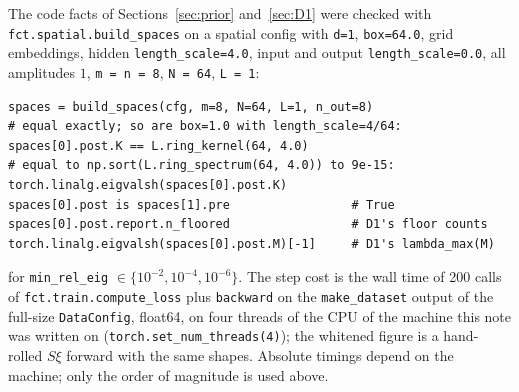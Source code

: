 \documentclass[11pt,a4paper]{article}
\newcommand{\code}[1]{\texttt{#1}}
\begin{document}
The code facts of Sections~\ref{sec:prior} and~\ref{sec:D1} were checked with \code{fct.spatial.build\_spaces} on a spatial config with \code{d=1}, \code{box=64.0}, grid embeddings, hidden \code{length\_scale=4.0}, input and output \code{length\_scale=0.0}, all amplitudes $1$, \code{m = n = 8}, \code{N = 64}, \code{L = 1}:
\begin{verbatim}
spaces = build_spaces(cfg, m=8, N=64, L=1, n_out=8)
# equal exactly; so are box=1.0 with length_scale=4/64:
spaces[0].post.K == L.ring_kernel(64, 4.0)
# equal to np.sort(L.ring_spectrum(64, 4.0)) to 9e-15:
torch.linalg.eigvalsh(spaces[0].post.K)
spaces[0].post is spaces[1].pre                 # True
spaces[0].post.report.n_floored                 # D1's floor counts
torch.linalg.eigvalsh(spaces[0].post.M)[-1]     # D1's lambda_max(M)
\end{verbatim}
for \code{min\_rel\_eig} $\in\{10^{-2}, 10^{-4}, 10^{-6}\}$. The step cost is the wall time of 200 calls of \code{fct.train.compute\_loss} plus \code{backward} on the \code{make\_dataset} output of the full-size \code{DataConfig}, float64, on four threads of the CPU of the machine this note was written on (\code{torch.set\_num\_threads(4)}); the whitened figure is a hand-rolled $S\xi$ forward with the same shapes. Absolute timings depend on the machine; only the order of magnitude is used above.
\end{document}
